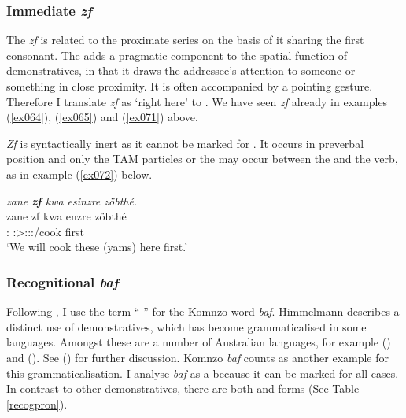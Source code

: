 \subsubsection{Immediate \emph{zf}} \label{immediate-dem}

The   \emph{zf} is related to the proximate series on the basis of it sharing the first consonant. The  adds a pragmatic component to the spatial function of demonstratives, in that it draws the addressee's attention to someone or something in close proximity. It is often accompanied by a pointing gesture. Therefore I translate \emph{zf} as `right here' to . We have seen \emph{zf} already in examples (\ref{ex064}), (\ref{ex065}) and (\ref{ex071}) above.%

\emph{Zf} is syntactically inert as it cannot be marked for . It occurs in preverbal position and only the TAM particles or the  may occur between the   and the verb, as in example (\ref{ex072}) below.

\begin{exe}
	\ex \emph{zane \textbf{zf} kwa esinzre zöbthé.}\\
	\gll zane zf kwa enzre zöbthé\\
	\Dem{}:\Prox{} \Imm{} \Fut{} \Fpl:\Sbj>\Stpl:\Obj:\Nonpast:\Ipfv/cook first\\
	\trans `We will cook these (yams) here first.' 
	\label{ex072}
\end{exe}

\subsubsection{Recognitional \emph{baf}} \label{recognitional-pronoun}

Following \citep{Himmelmann:1996tp}, I use the term `` '' for the Komnzo word \textit{baf}. Himmelmann describes a distinct  use of demonstratives, which has become grammaticalised in some languages. Amongst these are a number of Australian languages, for example  (\citealt{Heath:1984uk}) and  (\citealt{Goddard:1985tw}). See (\citealt[231ff.]{Himmelmann:1996tp}) for further discussion. Komnzo \emph{baf} counts as another example for this grammaticalisation. I analyse \emph{baf} as a  because it can be marked for all cases. In contrast to other demonstratives, there are both  and  forms (See Table \ref{recogpron}).%

